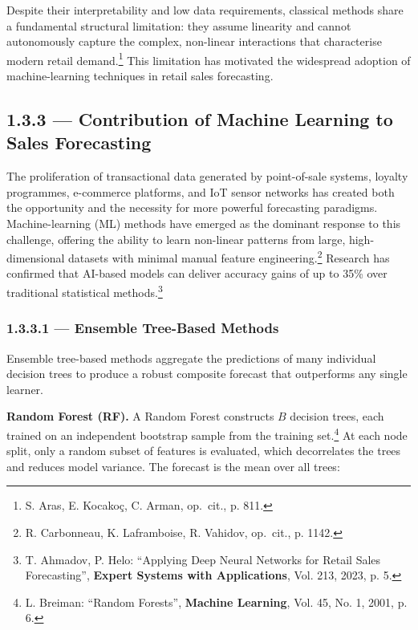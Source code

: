 \noindent Despite their interpretability and low data requirements, classical
methods share a fundamental structural limitation: they assume linearity and
cannot autonomously capture the complex, non-linear interactions that
characterise modern retail demand.\footnote{S. Aras, E. Kocakoç, C. Arman,
op.\ cit., p. 811.} This limitation has motivated the widespread adoption of
machine-learning techniques in retail sales forecasting.


\subsection{1.3.3 — Contribution of Machine Learning to Sales Forecasting}
\label{subsec:1.3.3}

The proliferation of transactional data generated by point-of-sale systems,
loyalty programmes, e-commerce platforms, and IoT sensor networks has
created both the opportunity and the necessity for more powerful forecasting
paradigms. Machine-learning (ML) methods have emerged as the dominant
response to this challenge, offering the ability to learn non-linear patterns
from large, high-dimensional datasets with minimal manual feature
engineering.\footnote{R. Carbonneau, K. Laframboise, R. Vahidov, op.\ cit.,
p. 1142.} Research has confirmed that AI-based models can deliver accuracy
gains of up to 35\% over traditional statistical
methods.\footnote{T. Ahmadov, P. Helo: ``Applying Deep Neural Networks for
Retail Sales Forecasting'', \textbf{Expert Systems with Applications},
Vol. 213, 2023, p. 5.}

\subsubsection{1.3.3.1 — Ensemble Tree-Based Methods}

Ensemble tree-based methods aggregate the predictions of many individual
decision trees to produce a robust composite forecast that outperforms any
single learner.

\medskip
\noindent\textbf{Random Forest (RF).}
A Random Forest constructs $B$ decision trees, each trained on an
independent bootstrap sample from the training set.\footnote{L. Breiman:
``Random Forests'', \textbf{Machine Learning}, Vol. 45, No. 1, 2001,
p. 6.} At each node split, only a random subset of features is evaluated,
which decorrelates the trees and reduces model variance. The forecast is the
mean over all trees:

